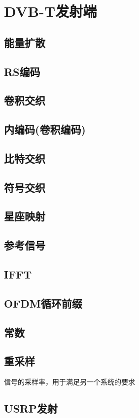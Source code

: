 \chapter{DVB-T发射端}
\section{能量扩散}
\section{RS编码}
\section{卷积交织}
\section{内编码(卷积编码)}
\section{比特交织}
\section{符号交织}
\section{星座映射}
\section{参考信号}
\section{IFFT}
\section{OFDM循环前缀}
\section{常数}
\section{重采样}
信号的采样率，用于满足另一个系统的要求
\section{USRP发射}
\endinput